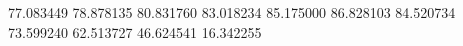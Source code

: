 77.083449
78.878135
80.831760
83.018234
85.175000
86.828103
84.520734
73.599240
62.513727
46.624541
16.342255
